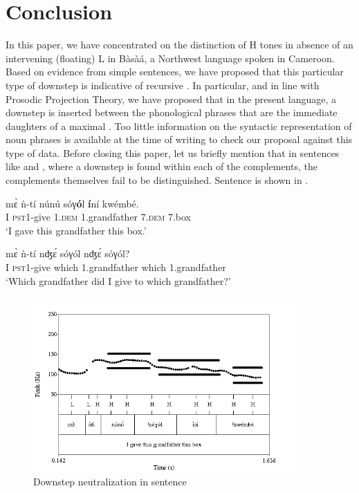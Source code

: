 \documentclass[output=paper,newtxmath,modfonts,nonflat,hidelinks]{langsci/langscibook}
\begin{document}
 
\section{Conclusion}\label{sec:HamlaouiMakasso:5} 

In this paper, we have concentrated on the distinction of  H tones in absence of an intervening (floating) L  in Bàsà{á}, a Northwest  language spoken in Cameroon. Based on evidence from simple sentences, we have proposed that this particular type of downstep is indicative of recursive . In particular, and in line with  Prosodic Projection Theory, we have proposed that in the present language, a downstep is inserted between the phonological phrases that are the immediate daughters of a maximal . Too little information on the syntactic representation of noun phrases is available at the time of writing to check our proposal against this type of data. 
Before closing this paper, let us briefly mention that in sentences like  and , where a downstep is found within each of the complements, the complements themselves fail to be distinguished. Sentence  is shown in . 

\ea \gll m\`ɛ ǹ-tí núnú {\↓}sóγ\textbf{ó}l \textbf{í}ní {\↓}kwémbé.\\
I \textsc{pst1}-give 1.\textsc{dem} 1.grandfather 7.\textsc{dem} 7.box\\
\glt `I gave this grandfather this box.'\label{ex:HamlaouiMakasso:27}
\z

\ea \gll m\`ɛ ǹ-tí nʤ\'ɛ {\↓}sóγól nʤ\'ɛ {\↓}sóγól?\\
I \textsc{pst1}-give which 1.grandfather which 1.grandfather\\
\glt `Which grandfather did I give to which grandfather?'\label{ex:HamlaouiMakasso:28} 
\z

\begin{figure}

\caption{Downstep neutralization in sentence }
\label{fig:HamlaouiMakasso:9b}
\includegraphics[width=10cm]{figures/NeutralizationSept16B}

\end{figure}
\end{document}
